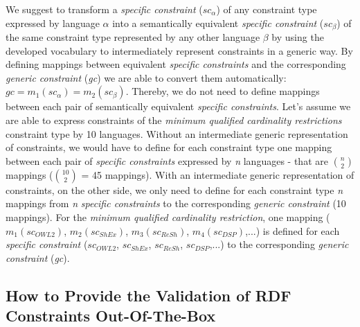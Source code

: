 \documentclass[a4paper,fontsize=11pt]{scrartcl}
\newcommand{\ms}[1]{\texttt{#1}}
\begin{document}
We suggest to transform a \emph{specific constraint} (\emph{$sc_{\alpha}$}) of any constraint type expressed by language \emph{$\alpha$} into a semantically equivalent \emph{specific constraint} (\emph{$sc_{\beta}$}) of the same constraint type represented by any other language \emph{$\beta$}
by using the developed vocabulary to intermediately represent constraints in a generic way. 
By defining mappings between equivalent \emph{specific constraints} and the corresponding \emph{generic constraint} (\emph{gc}) we are able to convert them automatically: 
{\small\ms{$ gc = m_1(sc_{\alpha}) = m_2(sc_{\beta}) $}}.
Thereby, we do not need to define mappings between each pair of semantically equivalent \emph{specific constraints}.
Let's assume we are able to express constraints of the \emph{minimum qualified cardinality restrictions} constraint type by 10 languages.
Without an intermediate generic representation of constraints, we would have to define for each constraint type one mapping between each pair of \emph{specific constraints} expressed by \emph{n} languages
- that are \emph{\( {n \choose 2} \)} mappings (\emph{\( {10 \choose 2} \)} = 45 mappings).
With an intermediate generic representation of constraints, on the other side, we only need to define for each constraint type \emph{n} mappings 
from \emph{n} \emph{specific constraints} to the corresponding \emph{generic constraint} (10 mappings).
For the \emph{minimum qualified cardinality restriction}, one mapping (\emph{$m_1(sc_{OWL 2})$}, \emph{$m_2(sc_{ShEx})$}, \emph{$m_3(sc_{ReSh})$}, \emph{$m_4(sc_{DSP})$},...) is defined for each \emph{specific constraint} (\emph{$sc_{OWL 2}$}, \emph{$sc_{ShEx}$}, \emph{$sc_{ReSh}$}, \emph{$sc_{DSP}$},...) to the corresponding \emph{generic constraint} (\emph{gc}).

\subsection{How to Provide the Validation of RDF Constraints Out-Of-The-Box}
\label{sec:validation}
\end{document}
